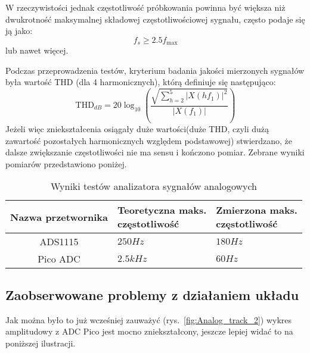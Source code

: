     W rzeczywistości jednak częstotliwość próbkowania powinna być większa niż 
    dwukrotność maksymalnej składowej częstotliwościowej sygnału, często podaje się ją
    jako:
    \begin{equation*}
        f_s \geq 2.5 f_{\max}
    \end{equation*}
    lub nawet więcej.

    Podczas przeprowadzenia testów, kryterium badania jakości mierzonych sygnałów była wartość
    THD (dla 4 harmonicznych), którą definiuje się następująco:
    \begin{equation*}
    \mathrm{THD}_{dB} = 20 \log_{10} \left( \frac{
    \sqrt{
    \sum_{h=2}^{5} \left|X(h f_1)\right|^2
    }
    }{
    \left|X(f_1)\right|
    } \right)
    \end{equation*}
    Jeżeli więc zniekształcenia osiągały duże wartości(duże THD, czyli dużą zawartość
    pozostałych harmonicznych względem podstawowej) stwierdzano, że dalsze zwiększanie częstotliwości nie ma sensu
    i kończono pomiar. Zebrane wyniki pomiarów przedstawiono poniżej.

    \begin{table}[!ht]
        \centering
        \begin{tabular}{|c|>{\centering\arraybackslash}m{4cm}|>{\centering\arraybackslash}m{4cm}|}
            \hline
            \textbf{Nazwa przetwornika} &
            \makecell{\textbf{Teoretyczna maks.}\\\textbf{częstotliwość}} &
            \makecell{\textbf{Zmierzona maks.}\\\textbf{częstotliwość}} \\
            \hline
            ADS1115 & $250 Hz$ & $180 Hz$ \\
            \hline
            Pico ADC & $2.5 kHz$ & $60 Hz$ \\
            \hline
        \end{tabular}
        \caption{Wyniki testów analizatora sygnałów analogowych}
        \label{tab:freq_test_results}
    \end{table}

    \subsection{Zaobserwowane problemy z działaniem układu}
    Jak można było to już wcześniej zauważyć (rys.~\ref{fig:Analog_track_2})
    wykres amplitudowy z ADC Pico jest mocno zniekształcony, jeszcze lepiej
    widać to na poniższej ilustracji.
     
